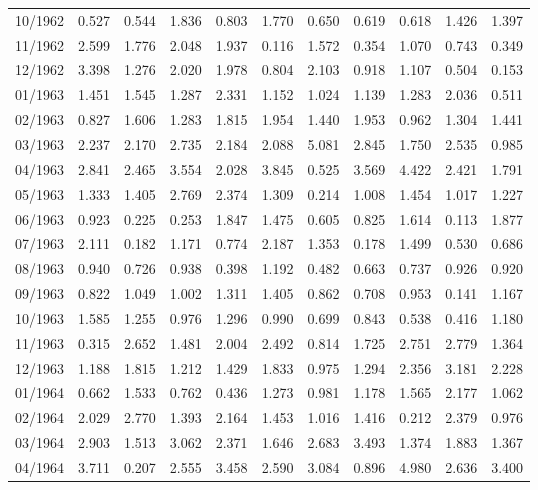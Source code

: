 \begin{tabular}{lrrrrrrrrrr}
10/1962 &  0.527 &  0.544 &  1.836 &  0.803 &  1.770 &  0.650 &  0.619 &  0.618 &  1.426 &  1.397 \\
11/1962 &  2.599 &  1.776 &  2.048 &  1.937 &  0.116 &  1.572 &  0.354 &  1.070 &  0.743 &  0.349 \\
12/1962 &  3.398 &  1.276 &  2.020 &  1.978 &  0.804 &  2.103 &  0.918 &  1.107 &  0.504 &  0.153 \\
01/1963 &  1.451 &  1.545 &  1.287 &  2.331 &  1.152 &  1.024 &  1.139 &  1.283 &  2.036 &  0.511 \\
02/1963 &  0.827 &  1.606 &  1.283 &  1.815 &  1.954 &  1.440 &  1.953 &  0.962 &  1.304 &  1.441 \\
03/1963 &  2.237 &  2.170 &  2.735 &  2.184 &  2.088 &  5.081 &  2.845 &  1.750 &  2.535 &  0.985 \\
04/1963 &  2.841 &  2.465 &  3.554 &  2.028 &  3.845 &  0.525 &  3.569 &  4.422 &  2.421 &  1.791 \\
05/1963 &  1.333 &  1.405 &  2.769 &  2.374 &  1.309 &  0.214 &  1.008 &  1.454 &  1.017 &  1.227 \\
06/1963 &  0.923 &  0.225 &  0.253 &  1.847 &  1.475 &  0.605 &  0.825 &  1.614 &  0.113 &  1.877 \\
07/1963 &  2.111 &  0.182 &  1.171 &  0.774 &  2.187 &  1.353 &  0.178 &  1.499 &  0.530 &  0.686 \\
08/1963 &  0.940 &  0.726 &  0.938 &  0.398 &  1.192 &  0.482 &  0.663 &  0.737 &  0.926 &  0.920 \\
09/1963 &  0.822 &  1.049 &  1.002 &  1.311 &  1.405 &  0.862 &  0.708 &  0.953 &  0.141 &  1.167 \\
10/1963 &  1.585 &  1.255 &  0.976 &  1.296 &  0.990 &  0.699 &  0.843 &  0.538 &  0.416 &  1.180 \\
11/1963 &  0.315 &  2.652 &  1.481 &  2.004 &  2.492 &  0.814 &  1.725 &  2.751 &  2.779 &  1.364 \\
12/1963 &  1.188 &  1.815 &  1.212 &  1.429 &  1.833 &  0.975 &  1.294 &  2.356 &  3.181 &  2.228 \\
01/1964 &  0.662 &  1.533 &  0.762 &  0.436 &  1.273 &  0.981 &  1.178 &  1.565 &  2.177 &  1.062 \\
02/1964 &  2.029 &  2.770 &  1.393 &  2.164 &  1.453 &  1.016 &  1.416 &  0.212 &  2.379 &  0.976 \\
03/1964 &  2.903 &  1.513 &  3.062 &  2.371 &  1.646 &  2.683 &  3.493 &  1.374 &  1.883 &  1.367 \\
04/1964 &  3.711 &  0.207 &  2.555 &  3.458 &  2.590 &  3.084 &  0.896 &  4.980 &  2.636 &  3.400 \\

\end{tabular}

